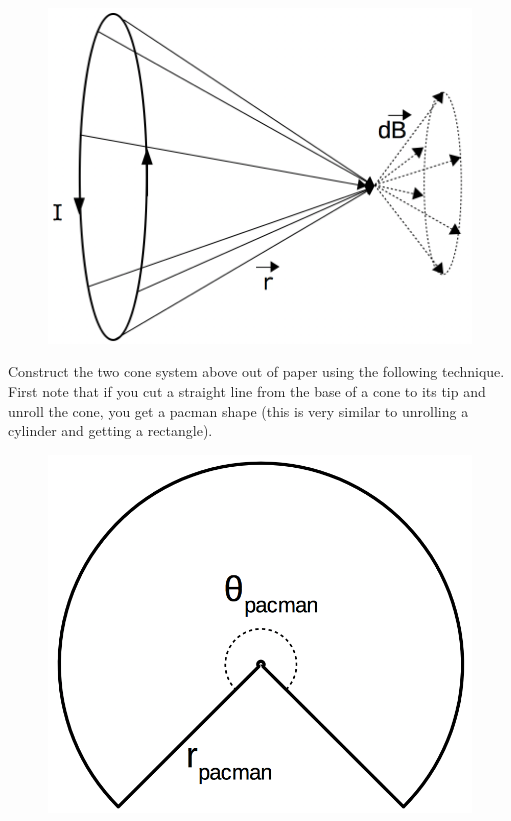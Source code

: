 \begin{figure}[H]
\includegraphics[scale=0.40]{figures/biot-savart/cones.png}
\end{figure}

Construct the two cone system above out of paper using the following technique.
First note that if you cut a straight line from the base of a cone to its tip and unroll the cone, you get a pacman shape (this is very similar to unrolling a cylinder and getting a rectangle).

\begin{figure}[H]
\includegraphics[scale=0.40]{figures/biot-savart/pacman.png}
\end{figure}

